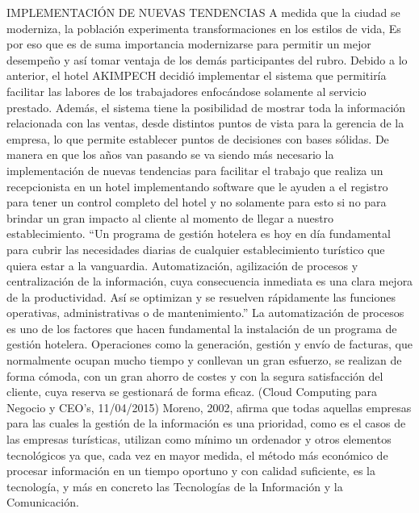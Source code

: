 \documentclass{comjnl}
\begin{document}
IMPLEMENTACIÓN DE NUEVAS TENDENCIAS
A medida que la ciudad se moderniza, la población experimenta transformaciones en los estilos de vida, Es por eso que es de suma importancia modernizarse para permitir un mejor desempeño y así tomar ventaja de los demás participantes del rubro. Debido a lo anterior, el hotel AKIMPECH decidió implementar el sistema que permitiría facilitar las labores de los trabajadores enfocándose solamente al servicio prestado. Además, el sistema tiene la posibilidad de mostrar toda la información relacionada con las ventas, desde distintos puntos de vista para la gerencia de la empresa, lo que permite establecer puntos de decisiones con bases sólidas.
De manera en que los años van pasando se va siendo más necesario la implementación de nuevas tendencias para facilitar el trabajo que realiza un recepcionista en un hotel implementando software que le ayuden a el registro para tener un control completo del hotel y no solamente para esto si no para brindar un gran impacto al cliente al momento de llegar a nuestro establecimiento. “Un programa de gestión hotelera es hoy en día fundamental para cubrir las necesidades diarias de cualquier establecimiento turístico que quiera estar a la vanguardia. Automatización, agilización de procesos y centralización de la información, cuya consecuencia inmediata es una clara mejora de la productividad. Así se optimizan y se resuelven rápidamente las funciones operativas, administrativas o de mantenimiento.”
La automatización de procesos es uno de los factores que hacen fundamental la instalación de un programa de gestión hotelera. Operaciones como la generación, gestión y envío de facturas, que normalmente ocupan mucho tiempo y conllevan un gran esfuerzo, se realizan de forma cómoda, con un gran ahorro de costes y con la segura satisfacción del cliente, cuya reserva se gestionará de forma eficaz. (Cloud Computing para Negocio y CEO's, 11/04/2015)
Moreno, 2002, afirma que todas aquellas empresas para las cuales la gestión de la información es una prioridad, como es el casos de las empresas turísticas, utilizan como mínimo un ordenador y otros elementos tecnológicos ya que, cada vez en mayor medida, el método más económico de procesar información en un tiempo oportuno y con calidad suficiente, es la tecnología, y más en concreto las Tecnologías de la Información y la Comunicación.
\end{document}
